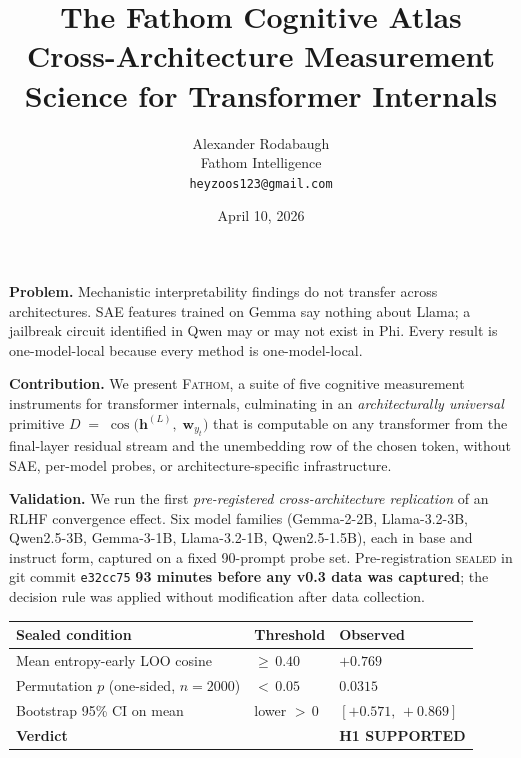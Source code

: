 \documentclass[11pt,letterpaper]{article}
\title{\textcolor{fathomblue}{The Fathom Cognitive Atlas}\\[4pt]
       \large Cross-Architecture Measurement Science for Transformer Internals}
\author{Alexander Rodabaugh\\
        Fathom Intelligence\\
        \texttt{heyzoos123@gmail.com}}
\date{April 10, 2026}
\begin{document}
\maketitle

\begin{execbox}

\textbf{Problem.} Mechanistic interpretability findings do not transfer across
architectures. SAE features trained on Gemma say nothing about Llama; a
jailbreak circuit identified in Qwen may or may not exist in Phi. Every result
is one-model-local because every method is one-model-local.

\textbf{Contribution.} We present \textsc{Fathom}, a suite of five cognitive
measurement instruments for transformer internals, culminating in an
\emph{architecturally universal} primitive
$D \;=\; \cos\!\big(\mathbf{h}^{(L)},\;\mathbf{w}_{y_t}\big)$ that is computable
on any transformer from the final-layer residual stream and the unembedding
row of the chosen token, without SAE, per-model probes, or architecture-specific
infrastructure.

\textbf{Validation.} We run the first \emph{pre-registered cross-architecture
replication} of an RLHF convergence effect. Six model families (Gemma-2-2B,
Llama-3.2-3B, Qwen2.5-3B, Gemma-3-1B, Llama-3.2-1B, Qwen2.5-1.5B), each in
base and instruct form, captured on a fixed 90-prompt probe set.
Pre-registration \textsc{sealed} in git commit \texttt{e32cc75}
\textbf{93 minutes before any v0.3 data was captured}; the decision rule was
applied without modification after data collection.

\vspace{4pt}
\begin{center}
\begin{tabular}{lll}
\toprule
\textbf{Sealed condition} & \textbf{Threshold} & \textbf{Observed} \\
\midrule
Mean entropy-early LOO cosine & $\geq\, 0.40$ & \textcolor{fathomgreen}{$\mathbf{+0.769}$} \\
Permutation $p$ (one-sided, $n\!=\!2000$) & $<\, 0.05$ & \textcolor{fathomgreen}{$\mathbf{0.0315}$} \\
Bootstrap 95\% CI on mean & lower $>\, 0$ & \textcolor{fathomgreen}{$\mathbf{[+0.571,\,+0.869]}$} \\
\midrule
\textbf{Verdict} & & \textbf{\textcolor{fathomgreen}{H1 SUPPORTED}} \\
\bottomrule
\end{tabular}
\end{center}
\vspace{4pt}


\end{execbox}
\end{document}
